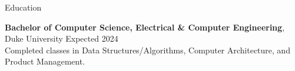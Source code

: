 \documentclass{resume}
\begin{document}






\begin{rSection}{Education}

\textbf{Bachelor of Computer Science, Electrical \& Computer Engineering}, Duke University \hfill {Expected 2024}\\
Completed classes in Data Structures/Algorithms, Computer Architecture, and Product Management.


\end{rSection}

\end{document}
